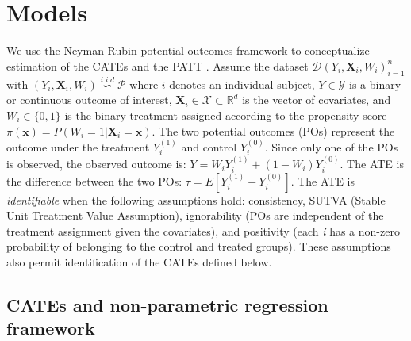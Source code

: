 \section{Models}\label{models}

We use the Neyman-Rubin potential outcomes framework to conceptualize
estimation of the CATEs and the PATT \citep{imbens2015causal}. Assume the
dataset \(\mathcal{D}{\left(Y_{i},\mathbf{X}_{i},W_{i}\right)}_{i=1}^{n}\)
with
\(\left(Y_{i},\mathbf{X}_{i},W_{i}\right)\overset{i.i.d}{\backsim}\mathcal{P}\)
where \(i\) denotes an individual subject, \(Y\in\mathcal{Y}\) is a binary
or continuous outcome of interest,
\(\mathbf{X}_{i}\in\mathcal{X}\subset\mathbb{R}^{d}\) is the vector of
covariates, and \(W_{i}\in\{0,1\}\) is the binary treatment assigned
according to the propensity score
\(\pi\left(\mathbf{x}\right)=P\left(W_{i}=1|\mathbf{X}_{i}=\mathbf{x}\right)\).
The two potential outcomes (POs) represent the outcome under the
treatment \(Y_{i}^{\left(1\right)}\) and control \(Y_{i}^{(0)}\). Since only
one of the POs is observed, the observed outcome is:
\(Y=W_{i}Y_{i}^{\left(1\right)}+\left(1-W_{i}\right)Y_{i}^{\left(0\right)}\).
The ATE is the difference between the two POs:
\(\tau=E\left[Y_{i}^{\left(1\right)}-Y_{i}^{\left(0\right)}\right]\). The
ATE is \emph{identifiable} when the following assumptions hold: consistency,
SUTVA (Stable Unit Treatment Value Assumption), ignorability (POs are
independent of the treatment assignment given the covariates), and
positivity (each \emph{i} has a non-zero probability of belonging to the
control and treated groups). These assumptions also permit
identification of the CATEs defined below.

\subsection{CATEs and non-parametric regression framework}\label{cates-and-non-parametric-regression-framework}

